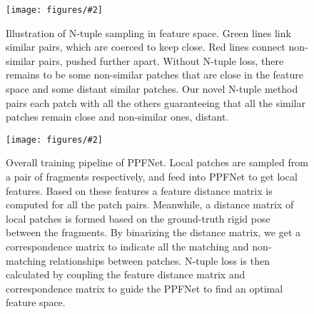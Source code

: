 \documentclass[10pt,twocolumn,letterpaper]{article}
\theoremstyle{break}
\newcommand{\insertimageC}[5]{ \begin{figure}[#5]
\centering
\texttt{[image: figures/\#2]}
\caption{#3}
\label{#4}
\vspace{-2mm}
\end{figure}
}
\newcommand{\insertimageStar}[5]{ \begin{figure*}[#5]
\centering
\texttt{[image: figures/\#2]}
\caption{#3}
\label{#4}
\vspace{-2mm}
\end{figure*}
}
\begin{document}
\insertimageC{1}{ntuple_config_cropped.pdf}{Illustration of N-tuple sampling in feature space. Green lines link similar pairs, which are coerced to keep close. Red lines connect non-similar pairs, pushed further apart. Without N-tuple loss, there remains to be some non-similar patches that are close in the feature space and some distant similar patches. Our novel N-tuple method pairs each patch with all the others guaranteeing that all the similar patches remain close and non-similar ones, distant.}{fig:ntuples}{t!}
\insertimageStar{1}{training_drawing_cropped.pdf}{Overall training pipeline of PPFNet. {Local patches are sampled from a pair of fragments respectively, and feed into PPFNet to get local features. Based on these features a feature distance matrix is computed for all the patch pairs. Meanwhile, a distance matrix of local patches is formed based on the ground-truth rigid pose between the fragments. By binarizing the distance matrix, we get a correspondence matrix to indicate all the matching and non-matching relationships between patches. N-tuple loss is then calculated by coupling the feature distance matrix and correspondence matrix to guide the PPFNet to find an optimal feature space.}}{fig:ppfnet_train}{t!}
\end{document}
